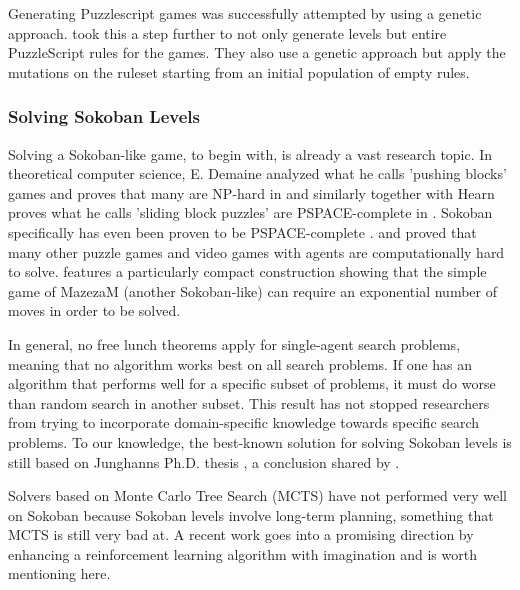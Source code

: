Generating Puzzlescript games was successfully attempted by \cite{Khalifa2015} using a genetic approach. \cite{Lim2014} took this a step further to not only generate levels but entire PuzzleScript rules for the games. They also use a genetic approach but apply the mutations on the ruleset starting from an initial population of empty rules. 



\subsubsection{Solving Sokoban Levels}

Solving a Sokoban-like game, to begin with, is already a vast research topic. In theoretical computer science, E. Demaine analyzed what he calls 'pushing blocks' games and proves that many are NP-hard in \cite{Demaine2003} and similarly together with Hearn proves what he calls 'sliding block puzzles' are PSPACE-complete in \cite{Hearn2005}. Sokoban specifically has even been proven to be PSPACE-complete \cite{Culberson1997}. \cite{Viglietta2014} and \cite{Hard2015} proved that many other puzzle games and video games with agents are computationally hard to solve. \cite{Williams2017} features a particularly compact construction showing that the simple game of MazezaM (another Sokoban-like) can require an exponential number of moves in order to be solved. %

In general, no free lunch theorems apply for single-agent search problems, meaning that no algorithm works best on all search problems. If one has an algorithm that performs well for a specific subset of problems, it must do worse than random search in another subset. This result has not stopped researchers from trying to incorporate domain-specific knowledge towards specific search problems. To our knowledge, the best-known solution for solving Sokoban levels is still based on Junghanns Ph.D. thesis \cite{Junghanns1999}, a conclusion shared by \cite{Froleyks2016}.

Solvers based on Monte Carlo Tree Search (MCTS) have not performed very well on Sokoban because Sokoban levels involve long-term planning, something that MCTS is still very bad at. A recent work \cite{Weber2017} goes into a promising direction by enhancing a reinforcement learning algorithm with imagination and is worth mentioning here.

